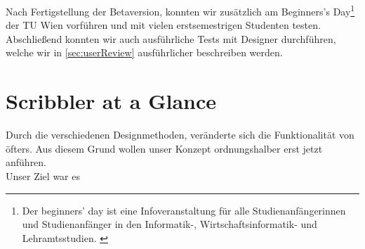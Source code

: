 \medskip Nach Fertigstellung der Betaversion, konnten wir \scribbler zusätzlich am Beginners's Day\footnote{Der beginners' day ist eine Infoveranstaltung für alle Studienanfängerinnen und Studienanfänger in den Informatik-, Wirtschaftsinformatik- und Lehramtsstudien. \citep{TU:2010}} der TU Wien vorführen und mit vielen erstsemestrigen Studenten testen. Abschließend konnten wir auch ausführliche Tests mit Designer durchführen, welche wir in \autoref{sec:userReview} ausführlicher beschreiben werden.

\section{Scribbler at a Glance}
Durch die verschiedenen Designmethoden, veränderte sich die Funktionalität von \scribbler öfters. Aus diesem Grund wollen unser Konzept  ordnungshalber erst jetzt anführen. \\
Unser Ziel war es 

